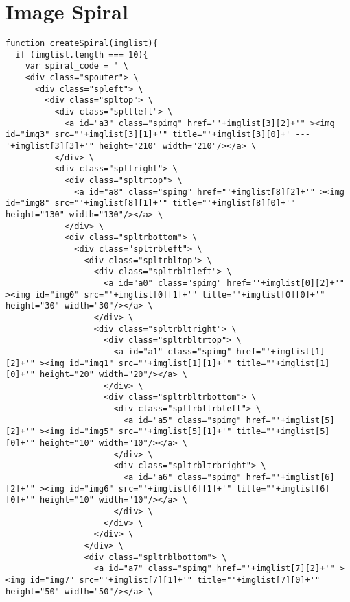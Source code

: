 
\chapter{Image Spiral}
\label{app:imgspiral}

\begin{listing}[!htbp] %
  \tiny
  \begin{verbatim}
function createSpiral(imglist){
  if (imglist.length === 10){
    var spiral_code = ' \
    <div class="spouter"> \
      <div class="spleft"> \
        <div class="spltop"> \
          <div class="spltleft"> \
            <a id="a3" class="spimg" href="'+imglist[3][2]+'" ><img id="img3" src="'+imglist[3][1]+'" title="'+imglist[3][0]+' --- '+imglist[3][3]+'" height="210" width="210"/></a> \
          </div> \
          <div class="spltright"> \
            <div class="spltrtop"> \
              <a id="a8" class="spimg" href="'+imglist[8][2]+'" ><img id="img8" src="'+imglist[8][1]+'" title="'+imglist[8][0]+'" height="130" width="130"/></a> \
            </div> \
            <div class="spltrbottom"> \
              <div class="spltrbleft"> \
                <div class="spltrbltop"> \
                  <div class="spltrbltleft"> \
                    <a id="a0" class="spimg" href="'+imglist[0][2]+'" ><img id="img0" src="'+imglist[0][1]+'" title="'+imglist[0][0]+'" height="30" width="30"/></a> \
                  </div> \
                  <div class="spltrbltright"> \
                    <div class="spltrbltrtop"> \
                      <a id="a1" class="spimg" href="'+imglist[1][2]+'" ><img id="img1" src="'+imglist[1][1]+'" title="'+imglist[1][0]+'" height="20" width="20"/></a> \
                    </div> \
                    <div class="spltrbltrbottom"> \
                      <div class="spltrbltrbleft"> \
                        <a id="a5" class="spimg" href="'+imglist[5][2]+'" ><img id="img5" src="'+imglist[5][1]+'" title="'+imglist[5][0]+'" height="10" width="10"/></a> \
                      </div> \
                      <div class="spltrbltrbright"> \
                        <a id="a6" class="spimg" href="'+imglist[6][2]+'" ><img id="img6" src="'+imglist[6][1]+'" title="'+imglist[6][0]+'" height="10" width="10"/></a> \
                      </div> \
                    </div> \
                  </div> \
                </div> \
                <div class="spltrblbottom"> \
                  <a id="a7" class="spimg" href="'+imglist[7][2]+'" ><img id="img7" src="'+imglist[7][1]+'" title="'+imglist[7][0]+'" height="50" width="50"/></a> \

\end{verbatim}
\end{listing}
